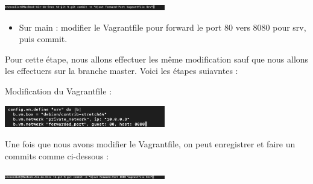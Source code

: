 \documentclass[12pt]{article}
\begin{document}
\vspace{0.3cm}

\begin{center}
  \includegraphics[width=7cm]{Image-TD-Git-4/commit-1.png}
\end{center}

\vspace{0.3cm}

\begin{itemize}
  \item Sur main : modifier le Vagrantfile pour forward le port 80 vers 8080 pour srv, puis commit.
\end{itemize}

\vspace{0.3cm}

Pour cette étape, nous allons effectuer les même modification sauf que nous allons les effectuers sur la branche master. Voici les étapes suiavntes : 

\vspace{0.3cm}

\vspace{0.3cm}

Modification du Vagrantfile : 

\vspace{0.3cm}

\begin{center}
  \includegraphics[width=7cm]{Image-TD-Git-4/Forward-port-2.png}
\end{center}

\vspace{0.3cm}

Une fois que nous avons modifier le Vagrantfile, on peut enregistrer et faire un commits comme ci-dessous : 

\vspace{0.3cm}

\begin{center}
  \includegraphics[width=7cm]{Image-TD-Git-4/commit-2.png}
\end{center}

\vspace{0.3cm}

\newpage
\end{document}

